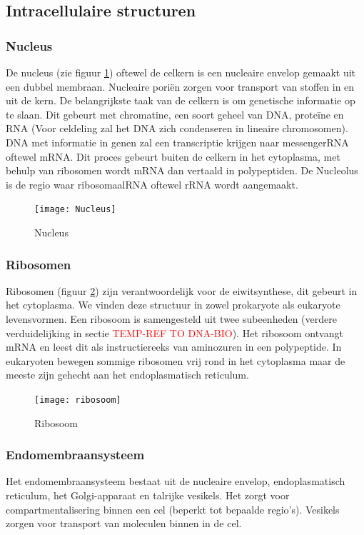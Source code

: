 \documentclass[a4paper,kul]{kulakarticle} %
\begin{document}
\subsection{Intracellulaire structuren}
\label{sec:IntracellulaireStructuren}
\subsubsection{Nucleus}
De nucleus (zie figuur \ref{fig:nucleus}) oftewel de celkern is een nucleaire envelop gemaakt uit een dubbel membraan. Nucleaire poriën zorgen voor transport van stoffen in en uit de kern. De belangrijkste taak van de celkern is om genetische informatie op te slaan. Dit gebeurt met chromatine, een soort geheel van DNA, proteïne en RNA (Voor celdeling zal het DNA zich condenseren in lineaire chromosomen). DNA met informatie in genen zal een transcriptie krijgen naar messengerRNA oftewel mRNA. Dit proces gebeurt buiten de celkern in het cytoplasma, met behulp van ribosomen wordt mRNA dan vertaald in polypeptiden. De Nucleolus is de regio waar ribosomaalRNA oftewel rRNA wordt aangemaakt.
\begin{figure}[h]
	\centering
	\texttt{[image: Nucleus]}
	\caption[Nucleus]{Nucleus}
	\label{fig:nucleus}
\end{figure}

\subsubsection{Ribosomen}
Ribosomen (figuur \ref{fig:ribosoom}) zijn verantwoordelijk voor de eiwitsynthese, dit gebeurt in het cytoplasma. We vinden deze structuur in zowel prokaryote als eukaryote levensvormen. Een ribosoom is samengesteld uit twee subeenheden (verdere verduidelijking in sectie \textcolor{red}{TEMP-REF TO DNA-BIO}). Het ribosoom ontvangt mRNA en leest dit als instructiereeks van aminozuren in een polypeptide. In eukaryoten bewegen sommige ribosomen vrij rond in het cytoplasma maar de meeste zijn gehecht aan het endoplasmatisch reticulum. 
\begin{figure}[h]
	\centering
	\texttt{[image: ribosoom]}
	\caption[Ribosoom]{Ribosoom}
	\label{fig:ribosoom}
\end{figure}

\subsubsection{Endomembraansysteem}
Het endomembraansysteem bestaat uit de nucleaire envelop, endoplasmatisch reticulum, het Golgi-apparaat en talrijke vesikels. Het zorgt voor compartmentalisering binnen een cel (beperkt tot bepaalde regio's). Vesikels zorgen voor transport van moleculen binnen in de cel.
\end{document}
